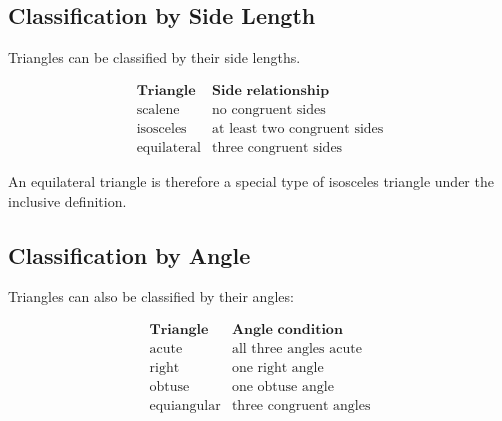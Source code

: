 \begin{centereddiagram}
\end{centereddiagram}

\subsection{Classification by Side Length}
\label{subsec:triangle-classification-sides}

Triangles can be classified by their side lengths.

\[
\begin{array}{c|c}
\textbf{Triangle} & \textbf{Side relationship}\\
\hline
\text{scalene} & \text{no congruent sides}\\
\text{isosceles} & \text{at least two congruent sides}\\
\text{equilateral} & \text{three congruent sides}
\end{array}
\]

An equilateral triangle is therefore a special type of isosceles triangle
under the inclusive definition.

\subsection{Classification by Angle}
\label{subsec:triangle-classification-angles}

Triangles can also be classified by their angles:

\[
\begin{array}{c|c}
\textbf{Triangle} & \textbf{Angle condition}\\
\hline
\text{acute} & \text{all three angles acute}\\
\text{right} & \text{one right angle}\\
\text{obtuse} & \text{one obtuse angle}\\
\text{equiangular} & \text{three congruent angles}
\end{array}
\]

